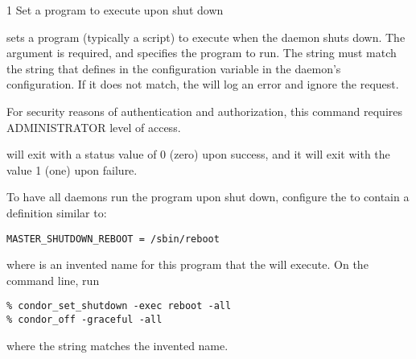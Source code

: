\begin{ManPage}{\label{man-condor-set-shutdown}}{1}
{Set a program to execute upon  shut down}

\Synopsis {}
\ToolArgsBase

\ToolDebugOption
\ToolWhere

\Description 

 sets a program (typically a script) to execute
when the  daemon shuts down.
The  argument is required,
and specifies the program to run.  
The string  must match the
string that defines  in the configuration variable
 in the  daemon's
configuration. 
If it does not match, the  will log an error and ignore the
request.

For security reasons of authentication and authorization,
this command requires ADMINISTRATOR level of access.

\begin{Options}
  \ToolArgsBaseDesc
  \ToolDebugDesc
  \ToolArgsLocateDesc
\end{Options}

\ExitStatus
{} will exit with a status value of 0 (zero) upon
success, and it will exit with the value 1 (one) upon failure.


\Examples
To have all  daemons run the program
 upon shut down, configure the  
to contain a definition similar to:
\begin{verbatim}
MASTER_SHUTDOWN_REBOOT = /sbin/reboot
\end{verbatim}
where  is an invented name for this program that
the  will execute.
On the command line, run
\begin{verbatim}
% condor_set_shutdown -exec reboot -all
% condor_off -graceful -all
\end{verbatim}
where the string \verb@reboot@ matches the invented name.

\end{ManPage}
